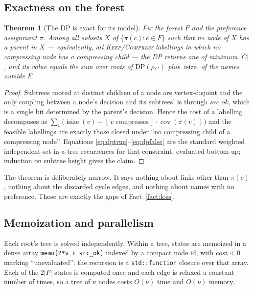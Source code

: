 \documentclass[11pt,a4paper]{article}
\theoremstyle{definition}
\theoremstyle{plain}
\newtheorem{theorem}{Theorem}
\theoremstyle{remark}
\newcommand{\cov}{\operatorname{cov}}
\newcommand{\isize}{\operatorname{isize}}
\newcommand{\pref}{\pi}
\newcommand{\KEEP}{\textnormal{\textsc{Keep}}}
\newcommand{\COMP}{\textnormal{\textsc{Compress}}}
\begin{document}
\subsection{Exactness on the forest}

\begin{theorem}[The DP is exact for its model]
\label{thm:dpexact}
Fix the forest $F$ and the preference assignment $\pref$. Among all
subsets $X$ of $\{\pref(c) : c \in F\}$ such that no node of $X$ has a
parent in $X$ --- equivalently, all \KEEP/\COMP{} labellings in which no
compressing node has a compressing child --- the DP returns one of
minimum $|C|$, and its value equals the sum over roots of
$\mathrm{DP}(\rho, \cdot)$ plus $\isize$ of the names outside $F$.
\end{theorem}

\begin{proof}
Subtrees rooted at distinct children of a node are vertex-disjoint and
the only coupling between a node's decision and its subtrees'
is through $\mathit{src\_ok}$, which is a single bit determined by the
parent's decision. Hence the cost of a labelling decomposes as
$\sum_v \bigl(\isize(v) - [\,v \text{ compresses}\,]\cdot\cov(\pref(v))\bigr)$
and the feasible labellings are exactly those closed under
``no compressing child of a compressing node''. Equations
\eqref{eq:dptrue}--\eqref{eq:dpfalse} are the standard weighted
independent-set-in-a-tree recurrences for that constraint, evaluated
bottom-up; induction on subtree height gives the claim.
\end{proof}

The theorem is deliberately narrow. It says nothing about links other
than $\pref(c)$, nothing about the discarded cycle edges, and nothing
about names with no preference. Those are exactly the gaps of
Fact~\ref{fact:loss}.

\subsection{Memoization and parallelism}

Each root's tree is solved independently. Within a tree, states are
memoized in a dense array \texttt{memo[2*v + src\_ok]} indexed by a
compact node id, with $\mathrm{cost} < 0$ marking ``unevaluated''; the
recursion is a \texttt{std::function} closure over that array. Each of
the $2|F|$ states is computed once and each edge is relaxed a constant
number of times, so a tree of $\nu$ nodes costs $O(\nu)$ time and
$O(\nu)$ memory.
\end{document}
